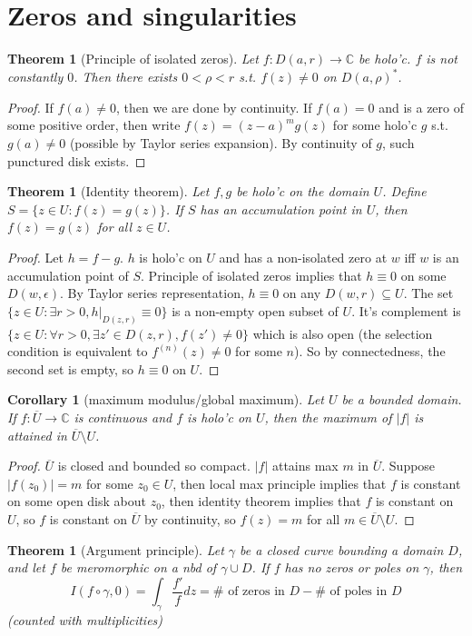 \documentclass{article}
\theoremstyle{definition}
\theoremstyle{remark}
\theoremstyle{plain}
\newtheorem{thm}[defn]{Theorem}
\newtheorem{crly}[defn]{Corollary}
\newcommand{\CC}{\mathbb{C}}
\begin{document}
\section{Zeros and singularities}
\begin{thm}[Principle of isolated zeros]
Let $f:D(a,r)\to\CC$ be holo'c. $f$ is not constantly $0$. Then there exists $0<\rho<r$ s.t. $f(z)\neq 0$ on $D(a,\rho)^\ast$.  
\end{thm}
\begin{proof}
    If $f(a)\neq 0$, then we are done by continuity. If $f(a)=0$ and is a zero of some positive order, then write $f(z)=(z-a)^mg(z)$ for some holo'c $g$ s.t. $g(a)\neq 0$ (possible by Taylor series expansion). By continuity of $g$, such punctured disk exists.
\end{proof}
\begin{thm}[Identity theorem]
Let $f,g$ be holo'c on the domain $U$. Define $S=\{z\in U:f(z)=g(z)\}$. If $S$ has an accumulation point in $U$, then $f(z)=g(z)$ for all $z\in U$.
\end{thm}
\begin{proof}
    Let $h=f-g$. $h$ is holo'c on $U$ and has a non-isolated zero at $w$ iff $w$ is an accumulation point of $S$. Principle of isolated zeros implies that $h\equiv 0$ on some $D(w,\epsilon)$. By Taylor series representation, $h\equiv 0$ on any $D(w,r)\subseteq U$. The set $\{z\in U:\exists r>0, h|_{D(z,r)}\equiv 0\}$ is a non-empty open subset of $U$. It's complement is $\{z\in U:\forall r>0, \exists z'\in D(z,r), f(z')\neq 0\}$ which is also open (the selection condition is equivalent to $f^{(n)}(z)\neq 0$ for some $n$). So by connectedness, the second set is empty, so $h\equiv 0$ on $U$.
\end{proof}
\begin{crly}[maximum modulus/global maximum]
Let $U$ be a bounded domain. If $f:\overline{U}\to\CC$ is continuous and $f$ is holo'c on $U$, then the maximum of $|f|$ is attained in $\overline{U}\setminus U$.
\end{crly}
\begin{proof}
    $\overline{U}$ is closed and bounded so compact. $|f|$ attains max  $m$ in $\overline{U}$. Suppose $|f(z_0)|=m$ for some $z_0\in U$, then local max principle implies that $f$ is constant on some open disk about $z_0$, then identity theorem implies that $f$ is constant on $U$, so $f$ is constant on $\overline{U}$ by continuity, so $f(z)=m$ for all $m\in\overline{U}\setminus U$.
\end{proof}
\begin{thm}[Argument principle]
Let $\gamma$ be a closed curve bounding a domain $D$, and let $f$ be meromorphic on a nbd of $\gamma\cup D$. If $f$ has no zeros or poles on $\gamma$, then
\[I(f\circ\gamma,0)=\int_\gamma \dfrac{f'}{f}dz=\#\text{ of zeros in }D-\#\text{ of poles in }D\] (counted with multiplicities)
\end{thm} 
\end{document}
